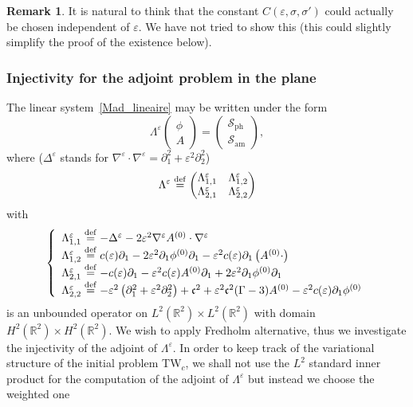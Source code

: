 \documentclass[10pt]{amsart}
\theoremstyle{definition}\newtheorem{defi}[theo]{Definition}\newtheorem{rema}[theo]{Remark}\newtheorem{exam}[theo]{Example}\newtheorem{exem}[theo]{Example}\newtheorem{nota}[theo]{Notation}
\newcommand*\p{\partial}
\newcommand*\R{\mathbb R}
\newcommand*\ddef{\stackrel{\rm def}{=}}
\newcommand{\amm}{\mathrm{am}}
\newcommand{\phl}{\mathrm{ph}}
\newcommand*\BS{\mathcal{S}}
\newcommand*\cs{{\mathfrak c}}
\newcommand*\e{\varepsilon}
\newcommand*\s{\sigma}
\begin{document}
\begin{rema}
It is natural to think that the constant $ C (\e, \s,\s') $ could actually be chosen independent of $ \e $. We have not tried to show this (this could slightly simplify the proof of the existence below).
\end{rema}



\subsubsection{Injectivity for the adjoint problem in the plane}\label{sec:injectif}

The linear system~\eqref{Mad_lineaire} may be written under the form
\begin{equation*}
\Lambda^\e
\begin{pmatrix}
\phi \\ A
\end{pmatrix} =
\begin{pmatrix} \BS_{\phl} \\ \BS_{\amm}
\end{pmatrix},
\end{equation*}
where ($\Delta^\e $ stands for $ \nabla^\e \cdot \nabla^\e = \p_1^2 + \e^2 \p_2^2 $)
\[
\Lambda^\e
\ddef
\begin{pmatrix}
\Lambda^\e_{1,1} & \Lambda^\e_{1,2} \\
\Lambda^\e_{2,1} & \Lambda^\e_{2,2}
\end{pmatrix}
\]
with
\begin{equation}
\left\{
\begin{array}{ll}
\Lambda^\e_{1,1} \ddef - \Delta^\e - 2 \e^2 \nabla^\e A^{(0)} \cdot \nabla^\e
\\
\Lambda^\e_{1,2} \ddef c(\e) \p_{1} - 2 \e^2 \p_{1} \phi^{(0)} \p_{1} - \e^2 c(\e) \p_1 \left(A^{(0)} \cdot\right)
\\
\Lambda^\e_{2,1} \ddef - c(\e) \p_{1} - \e^2 c(\e) A^{(0)} \p_1 + 2 \e^2 \p_{1} \phi^{(0)} \p_{1}
\\
\Lambda^\e_{2,2} \ddef - \e^2 \left(\p_{1}^2 + \e^2 \p_{2}^2\right) + \cs^2 + \e^2 \cs^2 (\Gamma -3)A^{(0)} - \e^2 c(\e) \p_1 \phi^{(0)}
\end{array}\right.
\end{equation}
is an unbounded operator on $ L^2 (\R^2) \times L^2 (\R^2) $ with domain $ H^2 (\R^2) \times H^2 (\R^2) $. We wish to apply Fredholm alternative, thus we investigate the injectivity of the adjoint of $ \Lambda^\e $. In order to keep track of the variational structure of the initial problem TW$_c $, we shall not use the $L^2 $ standard inner product for the computation of the adjoint of $ \Lambda^\e $ but instead we choose the weighted one
\end{document}
